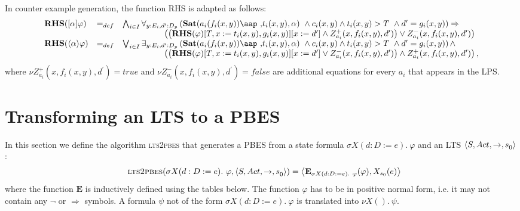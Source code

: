 In counter example generation, the function RHS is adapted as follows:%
\begin{equation*}
\begin{array}{lll}
{\mathbf{RHS}}([\alpha ]\varphi ) & =_{def} & \bigwedge_{i{\in }I}\forall _{y%
{:}E_{i},d^{\prime }{:}D_{p}}\left( \mathbf{Sat}(a_{i}(f_{i}(x,y))\mbox{\aap
,}t_{i}(x,y),\alpha )\ \wedge c_{i}(x,y)\wedge t_{i}(x,y)>T\ \wedge
d^{\prime }=g_{i}(x,y)\right) \Rightarrow  \\ 
&  & \phantom{\bigwedge_{i {\in} I} \forall_{y {:} E_i}(}\left( \left( {%
\mathbf{RHS}}(\varphi )[T,x:=t_{i}(x,y),g_{i}(x,y)][x:=d^{\prime }]\wedge
Z_{a_{i}}^{+}(x,f_{i}(x,y),d^{\prime })\right) \vee
Z_{a_{i}}^{-}(x,f_{i}(x,y),d^{\prime })\right)  \\ 
{\mathbf{RHS}}(\langle \alpha \rangle \varphi ) & =_{def} & \bigvee_{i{\in }%
I}\exists _{y{:}E_{i},d^{\prime }{:}D_{p}}\left( \mathbf{Sat}%
(a_{i}(f_{i}(x,y))\mbox{\aap
,}t_{i}(x,y),\alpha )\ \wedge c_{i}(x,y)\wedge t_{i}(x,y)>T\ \wedge
d^{\prime }=g_{i}(x,y)\right) \wedge  \\ 
&  & \phantom{\bigwedge_{i {\in} I} \forall_{y {:} E_i}(}\left( \left( {%
\mathbf{RHS}}(\varphi )[T,x:=t_{i}(x,y),g_{i}(x,y)][x:=d^{\prime }]\vee
Z_{a_{i}}^{-}(x,f_{i}(x,y),d^{\prime })\right) \wedge
Z_{a_{i}}^{+}(x,f_{i}(x,y),d^{\prime })\right) ,%
\end{array}%
\end{equation*}%
where $\nu Z_{a_{i}}^{+}(x,f_{i}(x,y),d^{\prime })=true$ and $\nu
Z_{a_{i}}^{-}(x,f_{i}(x,y),d^{\prime })=false$ are additional equations for
every $a_{i}$ that appears in the LPS.

\newpage 

\section{Transforming an LTS to a PBES}

In this section we define the algorithm \textsc{lts2pbes} that generates a
PBES from a state formula $\sigma X(d:D:=e).~\varphi $ and an LTS $\langle {%
S,Act,\rightarrow ,s}_{0}\rangle $ : 
\begin{equation*}
\text{\textsc{lts2pbes}}(\sigma X(d:D:=e).~\varphi ,\langle {%
S,Act,\rightarrow ,s}_{0}\rangle )=\left\langle \mathbf{E}_{\sigma
X(d:D:=e).~\varphi }(\varphi ),X_{s_{0}}(e)\right\rangle
\end{equation*}%
where the function $\mathbf{E}$ is inductively defined using the tables
below. The function $\varphi $ has to be in positive normal form, i.e. it
may not contain any $\lnot $ or $\Rightarrow $ symbols. A formula $\psi $
not of the form $\sigma X(d:D:=e).~\varphi $ is translated into $\nu
X().~\psi $.

